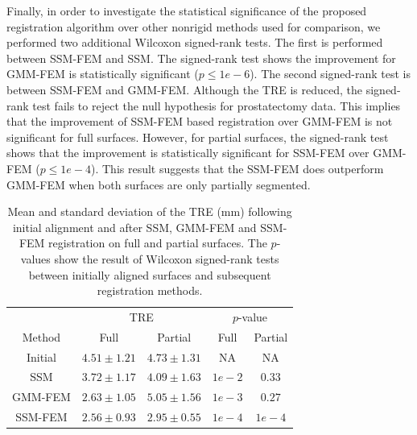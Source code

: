 \documentclass[journal]{IEEEtran}
\begin{document}
Finally, in order to investigate the statistical significance of the proposed registration algorithm over other nonrigid methods used for comparison, we performed two additional Wilcoxon signed-rank tests. The first is performed between SSM-FEM and SSM. The signed-rank test shows the improvement for GMM-FEM is statistically significant ($p\leq1e-6$). The second signed-rank test is between SSM-FEM and GMM-FEM. Although the TRE is reduced, the signed-rank test fails to reject the null hypothesis for prostatectomy data. This implies that the improvement of SSM-FEM based registration over GMM-FEM is not significant for full surfaces. However, for partial surfaces, the signed-rank test shows that the improvement is statistically significant for SSM-FEM over GMM-FEM ($p\leq1e-4$). This result suggests that the SSM-FEM does outperform GMM-FEM when both surfaces are only partially segmented.
\begin{table}[tb]
\begin{center}
\caption{Mean and standard deviation of the TRE (mm) following initial alignment and after SSM, GMM-FEM and SSM-FEM registration on full and partial surfaces. The $p$-values show the result of Wilcoxon signed-rank tests between initially aligned surfaces and subsequent registration methods.}
\centering
\begin{tabular}{c| c| c| c| c}
	\hline
	& \multicolumn{2}{c|}{TRE} & \multicolumn{2}{c}{$p$-value}\\
	\cline{2-3}  \cline{4-5}
	Method & Full & Partial & Full & Partial \\
	\hline
	Initial & $4.51 \pm 1.21$ & $4.73 \pm 1.31$ & NA & NA \\
	\hline
	SSM & $3.72 \pm 1.17$ & $4.09 \pm 1.63$ & $1e-2$ & $0.33$ \\
	\hline
	GMM-FEM & $2.63 \pm 1.05$ & $5.05 \pm 1.56$ & $1e-3$ & $0.27$ \\
	\hline
	SSM-FEM & $2.56 \pm 0.93$ & $2.95 \pm 0.55$ & $1e-4$ & $1e-4$ \\
   \hline
\end{tabular}
\label{tab:TRE}
\end{center}
\end{table}
\end{document}
